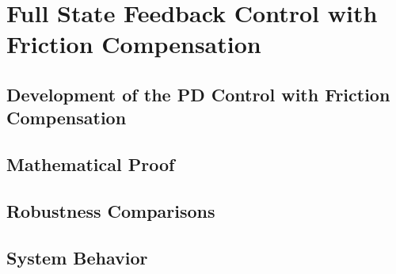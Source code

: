 




\section{Full State Feedback Control with Friction Compensation}

\subsection{Development of the PD Control with Friction Compensation}
\subsection{Mathematical Proof}
\subsection{Robustness Comparisons}
\subsection{System Behavior}
